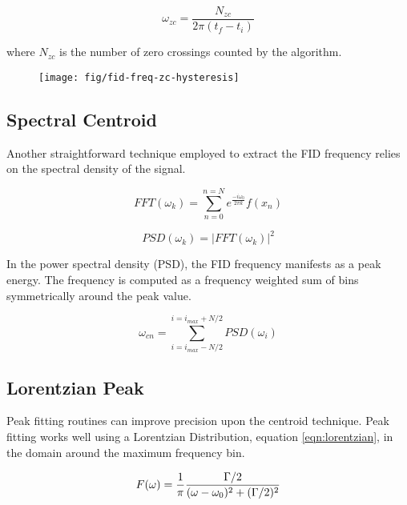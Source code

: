 \begin{equation}
\label{eqn:fig-freq-zc}
\omega_{zc} = \frac{N_{zc}}{2\pi(t_f - t_i)}
\end{equation}

\noindent 
where $N_{zc}$ is the number of zero crossings counted by the algorithm.

\begin{figure}
\label{fig:fid-freq-zc-hysteresis}
\texttt{[image: fig/fid-freq-zc-hysteresis]}
\end{figure}


\subsection{Spectral Centroid}
Another straightforward technique employed to extract the FID frequency relies on the spectral density of the signal. 

\begin{equation}
\label{eqn:fid-fft}
FFT(\omega_k) = \sum_{n=0}^{n=N} e^\frac{-i \omega_0}{2\pi k} f(x_n)
\end{equation}

\begin{equation}
\label{eqn:fid-psd}
PSD(\omega_k) = |FFT(\omega_k)|^2
\end{equation}

In the power spectral density (PSD), the FID frequency manifests as a peak energy.  The frequency is computed as a frequency weighted sum of bins symmetrically around the peak value.

\begin{equation}
\label{eqn:freq-cn}
\omega_{cn} = \sum_{i=i_{max} - N/2}^{i=i_{max} + N/2} PSD(\omega_i)
\end{equation}


\subsection{Lorentzian Peak}
Peak fitting routines can improve precision upon the centroid technique.  Peak fitting works well using a Lorentzian Distribution, equation \ref{eqn:lorentzian}, in the domain around the maximum frequency bin.

\begin{equation}
\label{eqn:lorentzian}
F(\omega) = \frac{1}{\pi} \\
\frac{\Gamma / 2}{(\omega - \omega_0)^2 + (\Gamma / 2)^2}
\end{equation}


